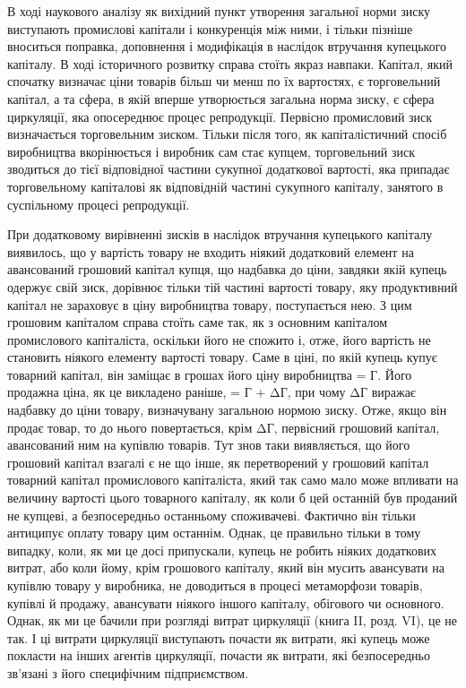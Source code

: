 \parcont{}  %
В ході наукового аналізу як вихідний пункт утворення загальної
норми зиску виступають промислові капітали і конкуренція
між ними, і тільки пізніше вноситься поправка, доповнення і модифікація
в наслідок втручання купецького капіталу. В ході історичного
розвитку справа стоїть якраз навпаки. Капітал, який спочатку
визначає ціни товарів більш чи менш по їх вартостях, є торговельний
капітал, а та сфера, в якій вперше утворюється загальна
норма зиску, є сфера циркуляції, яка опосереднює процес репродукції.
Первісно промисловий зиск визначається торговельним
зиском. Тільки після того, як капіталістичний спосіб виробництва
вкорінюється і виробник сам стає купцем, торговельний зиск
зводиться до тієї відповідної частини сукупної додаткової вартості,
яка припадає торговельному капіталові як відповідній
частині сукупного капіталу, занятого в суспільному процесі репродукції.

При додатковому вирівненні зисків в наслідок втручання
купецького капіталу виявилось, що у вартість товару не входить
ніякий додатковий елемент на авансований грошовий капітал
купця, що надбавка до ціни, завдяки якій купець одержує
свій зиск, дорівнює тільки тій частині вартості товару, яку
продуктивний капітал не зараховує в ціну виробництва товару,
поступається нею. З цим грошовим капіталом справа стоїть
саме так, як з основним капіталом промислового капіталіста,
оскільки його не спожито і, отже, його вартість не становить
ніякого елементу вартості товару. Саме в ціні, по якій купець
купує товарний капітал, він заміщає в грошах його ціну виробництва
= Г. Його продажна ціна, як це викладено раніше, = Г + ΔГ, при чому ΔГ виражає надбавку до ціни
товару,
визначувану загальною нормою зиску. Отже, якщо він продає
товар, то до нього повертається, крім ΔГ, первісний грошовий
капітал, авансований ним на купівлю товарів. Тут знов таки
виявляється, що його грошовий капітал взагалі є не що інше,
як перетворений у грошовий капітал товарний капітал промислового
капіталіста, який так само мало може впливати на величину
вартості цього товарного капіталу, як коли б цей останній
був проданий не купцеві, а безпосередньо останньому споживачеві.
Фактично він тільки антиципує оплату товару цим
останнім. Однак, це правильно тільки в тому випадку, коли, як
ми це досі припускали, купець не робить ніяких додаткових
витрат, або коли йому, крім грошового капіталу, який він мусить
авансувати на купівлю товару у виробника, не доводиться
в процесі метаморфози товарів, купівлі й продажу, авансувати
ніякого іншого капіталу, обігового чи основного. Однак, як ми
це бачили при розгляді витрат циркуляції (книга II, розд. VI),
це не так. І ці витрати циркуляції виступають почасти як витрати,
які купець може покласти на інших агентів циркуляції,
почасти як витрати, які безпосередньо зв’язані з його специфічним
підприємством.
